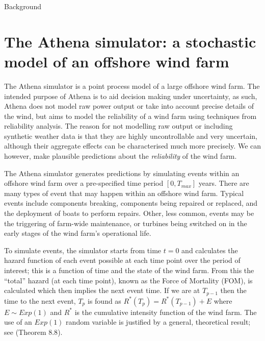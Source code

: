 \begin{chapter}{Background \label{Ch:background}}
\section{The Athena simulator: a stochastic model of an offshore wind farm\label{sec:athena}}
The Athena simulator \citep{Zit13, Zit16, Zit2021} is a point process model of a large offshore wind farm. The intended purpose of Athena is to aid decision making under uncertainty, as such, Athena does not model raw power output or take into account precise details of the wind, but aims to model the reliability of a wind farm using techniques from reliability analysis. The reason for not modelling raw output or including synthetic weather data is that they are highly uncontrollable and very uncertain, although their aggregate effects can be characterised much more precisely. We can however, make plausible predictions about the \textit{reliability} of the wind farm.

The Athena simulator generates predictions by simulating events within an offshore wind farm over a pre-specified time period $[0, T_{max}]$ years. There are many types of event that may happen within an offshore wind farm. Typical events include components breaking, components being repaired or replaced, and the deployment of boats to perform repairs. Other, less common, events may be the triggering of farm-wide maintenance, or turbines being switched on in the early stages of the wind farm's operational life.

To simulate events, the simulator starts from time $t=0$ and calculates the hazard function of each event possible at each time point over the period of interest; this is a function of time and the state of the wind farm. From this the ``total'' hazard (at each time point), known as the Force of Mortality (FOM), is calculated which then implies the next event time. If we are at $T_{p-1}$ then the time to the next event, $T_p$ is found as $R^{*}(T_p) = R^{*}(T_{p-1}) + E$ where $E \sim Exp(1)$ and $R^{*}$ is the cumulative intensity function of the wind farm. The use of an $Exp(1)$ random variable is justified by a general, theoretical result; see \citet{Pham2006} (Theorem $8.8$).


\end{chapter}
